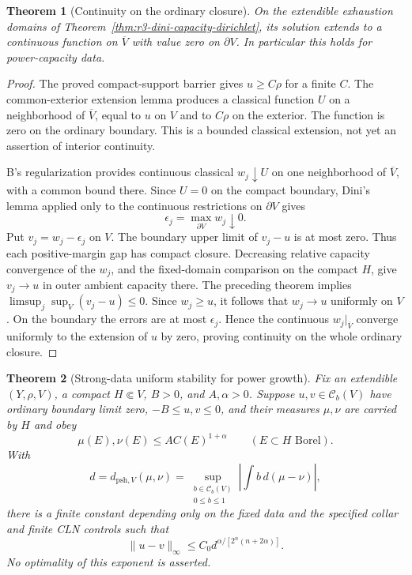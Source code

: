 \documentclass[11pt,a4paper]{article}
\numberwithin{equation}{section}
\newtheorem{theorem}{Theorem}[section]
\theoremstyle{definition}
\theoremstyle{remark}
\newcommand{\Cb}{\mathcal C_b}
\begin{document}
\begin{theorem}[Continuity on the ordinary closure]
\label{thm:r3-dini-solution-continuity}
On the extendible exhaustion domains of
Theorem~\ref{thm:r3-dini-capacity-dirichlet}, its solution extends
to a continuous function on $\overline V$ with value zero on
$\partial V$. In particular this holds for power-capacity data.
\end{theorem}

\begin{proof}
The proved compact-support barrier gives $u\geq C\rho$ for a
finite $C$. The common-exterior extension lemma produces a
classical function $U$ on a neighborhood of $\overline V$,
equal to $u$ on $V$ and to $C\rho$ on the exterior. The function
is zero on the ordinary boundary. This is a bounded classical
extension, not yet an assertion of interior continuity.

B's regularization provides continuous classical $w_j\downarrow U$
on one neighborhood of $\overline V$, with a common bound there.
Since $U=0$ on the compact boundary, Dini's lemma applied only to
the continuous restrictions on $\partial V$ gives
\[
 \epsilon_j=\max_{\partial V}w_j\downarrow0.
\]
Put $v_j=w_j-\epsilon_j$ on $V$. The boundary upper limit of
$v_j-u$ is at most zero. Thus each positive-margin gap has compact
closure. Decreasing relative capacity convergence of the $w_j$,
and the fixed-domain comparison on the compact $H$, give
$v_j\to u$ in outer ambient capacity there. The preceding theorem
implies $\limsup_j\sup_V(v_j-u)\leq0$.
Since $w_j\geq u$, it follows that $w_j\to u$ uniformly on $V$.
On the boundary the errors are at most $\epsilon_j$. Hence the
continuous $w_j|_{\overline V}$ converge uniformly to the extension
of $u$ by zero, proving continuity on the whole ordinary closure.
\end{proof}

\begin{theorem}[Strong-data uniform stability for power growth]
\label{thm:r3-power-dual-uniform-stability}
Fix an extendible $(Y,\rho,V)$, a compact $H\Subset V$, $B>0$,
and $A,\alpha>0$. Suppose $u,v\in\Cb(V)$ have ordinary boundary
limit zero, $-B\leq u,v\leq0$, and their measures $\mu,\nu$
are carried by $H$ and obey
\[
 \mu(E),\nu(E)\leq A C(E)^{1+\alpha}
             \qquad(E\subset H\text{ Borel}).
\]
With
\[
 d=d_{\mathrm{psh},V}(\mu,\nu)
   =\sup_{\substack{b\in\Cb(V)\\0\leq b\leq1}}
           \left|\int b\,d(\mu-\nu)\right|,
\]
there is a finite constant depending only on the fixed data and
the specified collar and finite CLN controls such that
\begin{equation}\label{eq:r3-power-dual-uniform-bound}
 \|u-v\|_\infty\leq C_0
             d^{\alpha/[2^n(n+2\alpha)]}.
\end{equation}
No optimality of this exponent is asserted.
\end{theorem}
\end{document}
